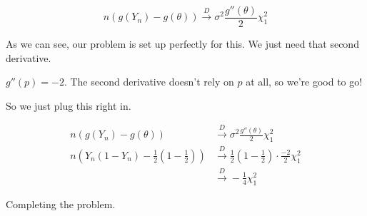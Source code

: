 \[
	n(g(Y_n) - g(\theta)) \xrightarrow{D} \sigma^2 \frac{g''(\theta)}{2} \chi^2_1
\]

As we can see, our problem is set up perfectly for this. We just need that second derivative.

$g''(p) = -2$. The second derivative doesn't rely on $p$ at all, so we're good to go!

So we just plug this right in.

\begin{align*}
	n(g(Y_n) - g(\theta)) &\xrightarrow{D} \sigma^2 \frac{g''(\theta)}{2} \chi^2_1 \\
	n\left(Y_n(1-Y_n) - \frac{1}{2}\left( 1 - \frac{1}{2} \right)\right) &\xrightarrow{D} \frac{1}{2} \left( 1 - \frac{1}{2} \right) \cdot \frac{-2}{2} \chi^2_1 \\
	&\xrightarrow{D} -\frac{1}{4} \chi^2_1
\end{align*}

Completing the problem.
